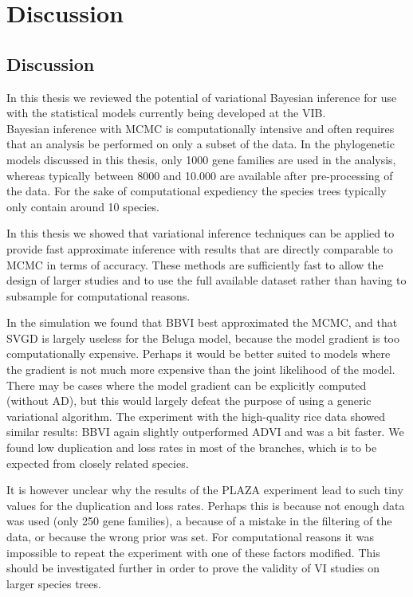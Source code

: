 \chapter{Discussion}


\section{Discussion}

In this thesis we reviewed the potential of variational Bayesian inference for use with the statistical models currently being developed at the VIB.
\\
Bayesian inference with MCMC is computationally intensive and often requires that an analysis be performed on only a subset of the data. In the phylogenetic models discussed in this thesis, only 1000 gene families are used in the analysis, whereas typically between 8000 and 10.000 are available after pre-processing of the data. For the sake of computational expediency the species trees typically only contain around 10 species.
\medskip
\par In this thesis we showed that variational inference techniques can be applied to provide fast approximate inference with results that are directly comparable to MCMC in terms of accuracy. These methods are sufficiently fast to allow the design of larger studies and to use the full available dataset rather than having to subsample for computational reasons.

\medskip

\par In the simulation we found that BBVI best approximated the MCMC, and that SVGD is largely useless for the Beluga model, because the model gradient is too computationally expensive. Perhaps it would be better suited to models where the gradient is not much more expensive than the joint likelihood of the model. There may be cases where the model gradient can be explicitly computed (without AD), but this would largely defeat the purpose of using a generic variational algorithm. The experiment with the high-quality rice data showed similar results: BBVI again slightly outperformed ADVI and was a bit faster. We found low duplication and loss rates in most of the branches, which is to be expected from closely related species.

\medskip

\par It is however unclear why the results of the PLAZA experiment lead to such tiny values for the duplication and loss rates. Perhaps this is because not enough data was used (only 250 gene families), a because of a mistake in the filtering of the data, or because the wrong prior was set. For computational reasons it was impossible to repeat the experiment with one of these factors modified. This should be investigated further in order to prove the validity of VI studies on larger species trees.

